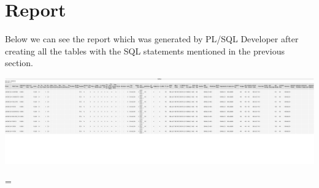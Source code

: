 \section{Report}

Below we can see the report which was generated by PL/SQL Developer after creating all the tables with the SQL statements mentioned in the previous section.

\newlength{\classpagewidth}
\setlength{\classpagewidth}{\pdfpagewidth}
\eject
\pdfpagewidth=115cm
\includegraphics[page=1]{images/report.pdf}

\eject
\pdfpagewidth=\classpagewidth